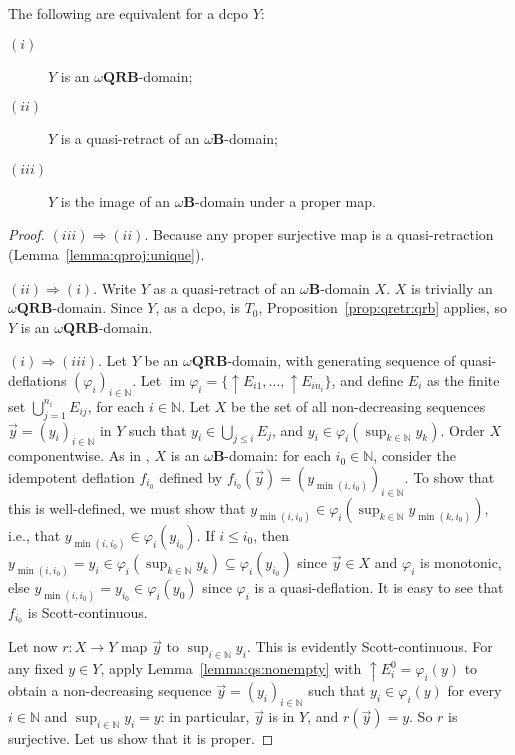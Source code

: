 \documentclass{LMCS}
\newcommand\limp{\Rightarrow}
\newcommand\nat{\mathbb{N}}
\newcommand\img{\mathop{\mathrm{im}}}
\newcommand\upc{\mathop{\uparrow}\nolimits}
\newcommand\QRB{\mathbf{QRB}}
\newcommand\B{\mathbf{B}}
\begin{document}
\begin{thm}
  \label{thm:qrb:qretr}
  The following are equivalent for a dcpo $Y$:
  \begin{description}
  \item[$(i)$] $Y$ is an $\omega\QRB$-domain;
  \item[$(ii)$] $Y$ is a quasi-retract of an $\omega\B$-domain;
  \item[$(iii)$] $Y$ is the image of an $\omega\B$-domain under a proper map.
  \end{description}
\end{thm}
\begin{proof}
  $(iii) \limp (ii)$.  Because any proper surjective map is a
  quasi-retraction (Lemma~\ref{lemma:qproj:unique}).

  $(ii) \limp (i)$.  Write $Y$ as a quasi-retract of an
  $\omega\B$-domain $X$.  $X$ is trivially an $\omega\QRB$-domain.
  Since $Y$, as a dcpo, is $T_0$, Proposition~\ref{prop:qretr:qrb}
  applies, so $Y$ is an $\omega\QRB$-domain.

  $(i) \limp (iii)$.  Let $Y$ be an $\omega\QRB$-domain, with
  generating sequence of quasi-deflations ${(\varphi_i)}_{i \in
    \nat}$.  Let $\img \varphi_i = \{\upc E_{i1}, \ldots, \upc
  E_{in_i}\}$, and define $E_i$ as the finite set $\bigcup_{j=1}^{n_i}
  E_{ij}$, for each $i \in \nat$.  Let $X$ be the set of all
  non-decreasing sequences $\vec y = {(y_i)}_{i \in \nat}$ in $Y$ such
  that $y_i \in \bigcup_{j \leq i} E_j$, and $y_i \in \varphi_i
  (\sup_{k \in \nat} y_k)$.  Order $X$ componentwise.  As in
  \cite[Theorem~4.9, Theorem~4.1]{Jung:CCC}, $X$ is an
  $\omega\B$-domain: for each $i_0 \in \nat$, consider the idempotent
  deflation $f_{i_0}$ defined by $f_{i_0} (\vec y) = {(y_{\min (i,
      i_0)})}_{i \in \nat}$.  To show that this is well-defined, we
  must show that $y_{\min (i,i_0)} \in \varphi_i (\sup_{k \in \nat}
  y_{\min (k,i_0)})$, i.e., that $y_{\min (i, i_0)} \in \varphi_i
  (y_{i_0})$.  If $i \leq i_0$, then $y_{\min (i,i_0)} = y_i \in
  \varphi_i (\sup_{k \in \nat} y_k) \subseteq \varphi_i (y_{i_0})$
  since $\vec y \in X$ and $\varphi_i$ is monotonic, else $y_{\min
    (i,i_0)} = y_{i_0} \in \varphi_i (y_0)$ since $\varphi_i$ is a
  quasi-deflation.  It is easy to see that $f_{i_0}$ is
  Scott-continuous.

  Let now $r : X \to Y$ map $\vec y$ to $\sup_{i \in \nat} y_i$.  This
  is evidently Scott-continuous.  For any fixed $y \in Y$, apply
  Lemma~\ref{lemma:qs:nonempty} with $\upc E^0_i = \varphi_i (y)$ to
  obtain a non-decreasing sequence $\vec y = {(y_i)}_{i \in \nat}$
  such that $y_i \in \varphi_i (y)$ for every $i \in \nat$ and
  $\sup_{i \in \nat} y_i = y$: in particular, $\vec y$ is in $Y$, and
  $r (\vec y) = y$.  So $r$ is surjective.  Let us show that it is
  proper.


\end{proof}
\end{document}
